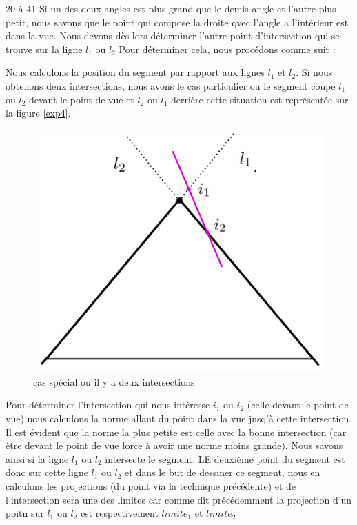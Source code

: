 \documentclass[11pt,a4paper]{article}
\theoremstyle{definition}
\theoremstyle{remark}
\begin{document}
20 à 41
Si un des deux angles est plus grand que le demis angle et l'autre plus petit, nous savons que le point qui compose la droite qvec l'angle a l'intérieur est dans la vue. Nous devons dès lors déterminer l'autre point d'intersection qui se trouve sur la ligne $l_1$ ou 
$l_2$ Pour déterminer cela, nous procédons comme suit :

Nous calculons la position du segment par rapport aux lignes $l_1$ et $l_2$. Si nous obtenons deux intersections, nous avons le cas particulier ou le segment coupe $l_1$ ou $l_2$ devant le point de vue et $l_2$ ou $l_1$ derrière cette situation est représentée sur la figure \ref{exp4}. 

\begin{figure}[H]
\centering
\includegraphics[scale=0.6]{casSpecial1.png}
\caption{cas spécial ou il y a deux intersections}
\label{exp_4}
\end{figure}

Pour déterminer l'intersection qui nous intéresse $i_1$ ou $i_2$ (celle devant le point de vue)  nous calculons la norme allant du point dans la vue jusq'à cette intersection. Il est évident que la norme la plus petite est celle avec la bonne intersection (car être devant le point de vue force à avoir une norme moins grande). Nous savons ainsi si la ligne $l_1$ ou $l_2$ intersecte le segment. LE deuxième point du segment est donc sur cette ligne $l_1$ ou $l_2$ et dans le but de dessiner ce segment, nous en calculons les projections (du point via la technique précédente) et de l'intersection sera une des limites car comme dit précédemment la projection d'un poitn sur $l_1$ ou $l_2$ est respectivement $limite_1$ et $limite_2$
\end{document}
